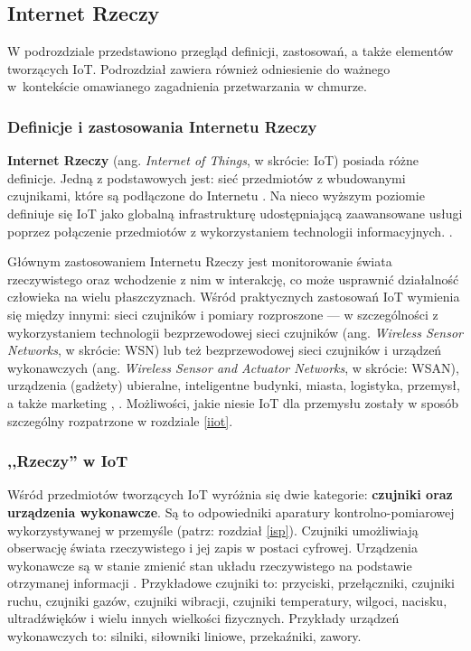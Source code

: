 \documentclass[a4paper, 12pt, twoside]{article}
\begin{document}
\subsection{Internet Rzeczy}\label{iot}

W podrozdziale przedstawiono przegląd definicji, zastosowań, a także
elementów tworzących IoT. Podrozdział zawiera również odniesienie do ważnego
w~kontekście omawianego zagadnienia przetwarzania w chmurze.

\subsubsection{Definicje i zastosowania Internetu Rzeczy}

\textbf{Internet Rzeczy} (ang. \emph{Internet of Things}, w skrócie: IoT) posiada różne definicje.
Jedną z podstawowych jest: sieć przedmiotów z wbudowanymi czujnikami, które są podłączone
do Internetu \cite{intro-to-iot}. Na nieco wyższym poziomie definiuje się IoT jako globalną infrastrukturę udostępniającą
zaawansowane usługi poprzez połączenie przedmiotów z wykorzystaniem technologii informacyjnych.
\cite{intro-to-iot}.

Głównym zastosowaniem Internetu Rzeczy jest monitorowanie świata rzeczywistego
oraz wchodzenie z nim w interakcję, co może usprawnić działalność człowieka na wielu płaszczyznach.
Wśród praktycznych zastosowań IoT wymienia się między innymi:
sieci czujników i pomiary rozproszone --- w szczególności z wykorzystaniem
technologii bezprzewodowej sieci czujników
(ang. \emph{Wireless Sensor Networks}, w skrócie: WSN) lub też
bezprzewodowej sieci czujników i urządzeń wykonawczych
(ang. \emph{Wireless Sensor and Actuator Networks}, w skrócie: WSAN), urządzenia (gadżety) ubieralne,
inteligentne budynki, miasta, logistyka, przemysł, a także marketing \cite{internet-reczy},
\cite{wsan}.
Możliwości, jakie niesie IoT dla przemysłu zostały w sposób szczególny rozpatrzone
w rozdziale \ref{iiot}.

\subsubsection{,,Rzeczy'' w IoT}

Wśród przedmiotów tworzących IoT wyróżnia się dwie kategorie:
\textbf{czujniki oraz urządzenia wykonawcze}. Są to odpowiedniki aparatury kontrolno-pomiarowej
wykorzystywanej w przemyśle (patrz: rozdział \ref{isp}). Czujniki umożliwiają
obserwację świata rzeczywistego i jej zapis w postaci cyfrowej.
Urządzenia wykonawcze są w stanie zmienić stan układu rzeczywistego
na podstawie otrzymanej informacji \cite{iot-hype-to-reality}.
Przykładowe czujniki to: przyciski, przełączniki, czujniki ruchu, czujniki gazów,
czujniki wibracji, czujniki temperatury, wilgoci,
nacisku, ultradźwięków i wielu innych wielkości fizycznych. Przykłady urządzeń
wykonawczych to: silniki, siłowniki liniowe, przekaźniki, zawory. 
\end{document}
